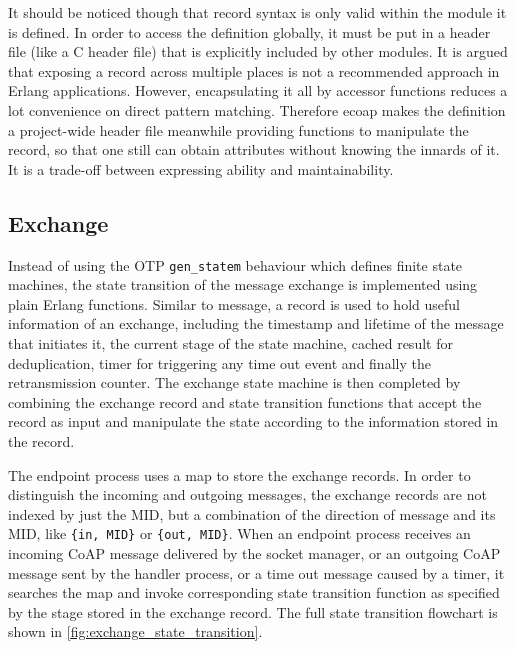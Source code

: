 
It should be noticed though that record syntax is only valid within the module it is defined. In order to access the definition globally, it must be put in a header file (like a C header file) that is explicitly included by other modules. It is argued that exposing a record across multiple places is not a recommended approach in Erlang applications. However, encapsulating it all by accessor functions reduces a lot convenience on direct pattern matching. Therefore ecoap makes the definition a project-wide header file meanwhile providing functions to manipulate the record, so that one still can obtain attributes without knowing the innards of it. It is a trade-off between expressing ability and maintainability. 

\subsection{Exchange}\label{exchange_implementation}

Instead of using the OTP \verb|gen_statem| behaviour which defines finite state machines, the state transition of the message exchange is implemented using plain Erlang functions. Similar to message, a record is used to hold useful information of an exchange, including the timestamp and lifetime of the message that initiates it, the current stage of the state machine, cached result for deduplication, timer for triggering any time out event and finally the retransmission counter. The exchange state machine is then completed by combining the exchange record and state transition functions that accept the record as input and manipulate the state according to the information stored in the record.

The endpoint process uses a map to store the exchange records. In order to distinguish the incoming and outgoing messages, the exchange records are not indexed by just the MID, but a combination of the direction of message and its MID, like \verb|{in, MID}| or \verb|{out, MID}|. When an endpoint process receives an incoming CoAP message delivered by the socket manager, or an outgoing CoAP message sent by the handler process, or a time out message caused by a timer, it searches the map and invoke corresponding state transition function as specified by the stage stored in the exchange record. The full state transition flowchart is shown in \autoref{fig:exchange_state_transition}.

